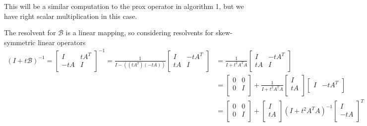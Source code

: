 \documentclass{article}
\theoremstyle{definition}
\theoremstyle{remark}
\begin{document}
This will be a similar computation to the prox operator in algorithm 1, but we have right scalar multiplication in this case. 

The resolvent for $\mathcal{B}$ is a linear mapping, so considering resolvents for skew-symmetric linear operators 
\begin{align*}
  {(I + t\mathcal{B})}^{-1} = 
  {\begin{bmatrix}
    I & tA^T \\
    -tA & I \\
  \end{bmatrix}}^{-1} =
  \frac{1}{I - ((tA^T)(-tA))}
  \begin{bmatrix}
    I & -tA^T \\
    tA & I \\
  \end{bmatrix} &=
  \frac{1}{I + t^2A^T A}
  \begin{bmatrix}
    I & -tA^T \\
    tA & I \\
  \end{bmatrix} \\
  &=
  \begin{bmatrix}
    0 & 0 \\
    0 & I \\
  \end{bmatrix} + 
  \frac{1}{I + t^2A^T A}
  \begin{bmatrix}
    I \\
    tA \\
  \end{bmatrix}
  \begin{bmatrix}
    I & -tA^T \\
  \end{bmatrix} \\
  &=
  \begin{bmatrix}
    0 & 0 \\
    0 & I \\
  \end{bmatrix} +
  \begin{bmatrix}
    I \\
    tA \\
  \end{bmatrix}
  {(I + t^2A^T A)}^{-1}
  {\begin{bmatrix}
    I \\
    -tA \\
  \end{bmatrix}}^T \\
\end{align*}
\end{document}
